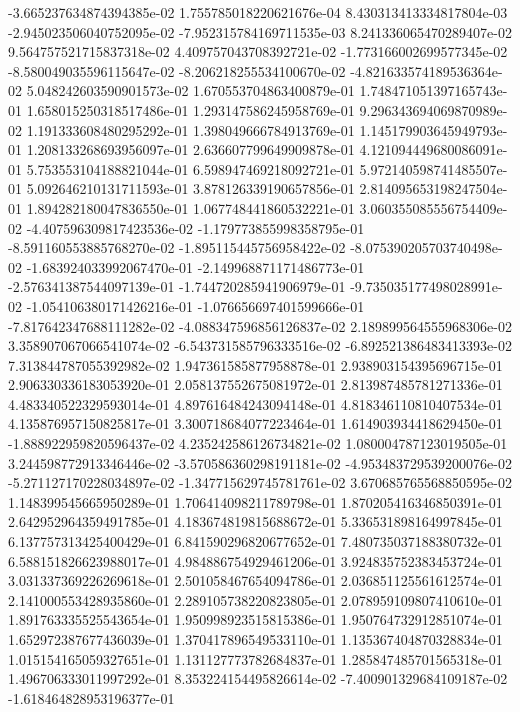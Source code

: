 -3.665237634874394385e-02
1.755785018220621676e-04
8.430313413334817804e-03
-2.945023506040752095e-02
-7.952315784169711535e-03
8.241336065470289407e-02
9.564757521715837318e-02
4.409757043708392721e-02
-1.773166002699577345e-02
-8.580049035596115647e-02
-8.206218255534100670e-02
-4.821633574189536364e-02
5.048242603590901573e-02
1.670553704863400879e-01
1.748471051397165743e-01
1.658015250318517486e-01
1.293147586245958769e-01
9.296343694069870989e-02
1.191333608480295292e-01
1.398049666784913769e-01
1.145179903645949793e-01
1.208133268693956097e-01
2.636607799649909878e-01
4.121094449680086091e-01
5.753553104188821044e-01
6.598947469218092721e-01
5.972140598741485507e-01
5.092646210131711593e-01
3.878126339190657856e-01
2.814095653198247504e-01
1.894282180047836550e-01
1.067748441860532221e-01
3.060355085556754409e-02
-4.407596309817423536e-02
-1.179773855998358795e-01
-8.591160553885768270e-02
-1.895115445756958422e-02
-8.075390205703740498e-02
-1.683924033992067470e-01
-2.149968871171486773e-01
-2.576341387544097139e-01
-1.744720285941906979e-01
-9.735035177498028991e-02
-1.054106380171426216e-01
-1.076656697401599666e-01
-7.817642347688111282e-02
-4.088347596856126837e-02
2.189899564555968306e-02
3.358907067066541074e-02
-6.543731585796333516e-02
-6.892521386483413393e-02
7.313844787055392982e-02
1.947361585877958878e-01
2.938903154395696715e-01
2.906330336183053920e-01
2.058137552675081972e-01
2.813987485781271336e-01
4.483340522329593014e-01
4.897616484243094148e-01
4.818346110810407534e-01
4.135876957150825817e-01
3.300718684077223464e-01
1.614903934418629450e-01
-1.888922959820596437e-02
4.235242586126734821e-02
1.080004787123019505e-01
3.244598772913346446e-02
-3.570586360298191181e-02
-4.953483729539200076e-02
-5.271127170228034897e-02
-1.347715629745781761e-02
3.670685765568850595e-02
1.148399545665950289e-01
1.706414098211789798e-01
1.870205416346850391e-01
2.642952964359491785e-01
4.183674819815688672e-01
5.336531898164997845e-01
6.137757313425400429e-01
6.841590296820677652e-01
7.480735037188380732e-01
6.588151826623988017e-01
4.984886754929461206e-01
3.924835752383453724e-01
3.031337369226269618e-01
2.501058467654094786e-01
2.036851125561612574e-01
2.141000553428935860e-01
2.289105738220823805e-01
2.078959109807410610e-01
1.891763335525543654e-01
1.950998923515815386e-01
1.950764732912851074e-01
1.652972387677436039e-01
1.370417896549533110e-01
1.135367404870328834e-01
1.015154165059327651e-01
1.131127773782684837e-01
1.285847485701565318e-01
1.496706333011997292e-01
8.353224154495826614e-02
-7.400901329684109187e-02
-1.618464828953196377e-01
